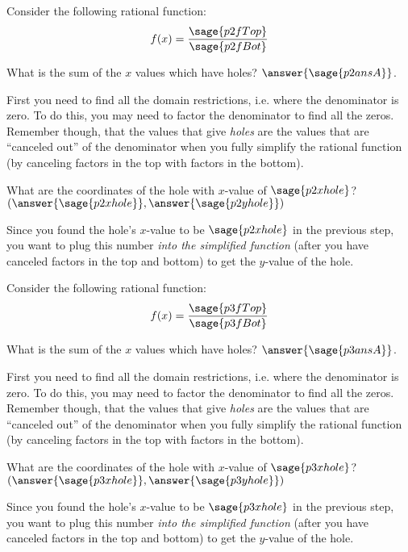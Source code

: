 \documentclass{ximera}
\begin{document}
\begin{problem}
    Consider the following rational function:
    \[
        f(x) = \frac{\sage{p2fTop}}{\sage{p2fBot}}
    \]
    
    What is the sum of the $x$ values which have holes? $\answer{\sage{p2ansA}}$.
    \begin{feedback}
        First you need to find all the domain restrictions, i.e. where the denominator is zero. To do this, you may need to factor the denominator to find all the zeros. Remember though, that the values that give \textit{holes} are the values that are ``canceled out'' of the denominator when you fully simplify the rational function (by canceling factors in the top with factors in the bottom).
    \end{feedback}
    \begin{problem}
        What are the coordinates of the hole with $x$-value of $\sage{p2xhole}$? $(\answer{\sage{p2xhole}},\answer{\sage{p2yhole}})$
        \begin{feedback}
            Since you found the hole's $x$-value to be $\sage{p2xhole}$ in the previous step, you want to plug this number \textit{into the simplified function} (after you have canceled factors in the top and bottom) to get the $y$-value of the hole.
        \end{feedback}
    \end{problem}

\end{problem}


\begin{problem}
    Consider the following rational function:
    \[
        f(x) = \frac{\sage{p3fTop}}{\sage{p3fBot}}
    \]
    
    What is the sum of the $x$ values which have holes? $\answer{\sage{p3ansA}}$.
    \begin{feedback}
        First you need to find all the domain restrictions, i.e. where the denominator is zero. To do this, you may need to factor the denominator to find all the zeros. Remember though, that the values that give \textit{holes} are the values that are ``canceled out'' of the denominator when you fully simplify the rational function (by canceling factors in the top with factors in the bottom).
    \end{feedback}
    \begin{problem}
        What are the coordinates of the hole with $x$-value of $\sage{p3xhole}$? $(\answer{\sage{p3xhole}},\answer{\sage{p3yhole}})$
        \begin{feedback}
            Since you found the hole's $x$-value to be $\sage{p3xhole}$ in the previous step, you want to plug this number \textit{into the simplified function} (after you have canceled factors in the top and bottom) to get the $y$-value of the hole.
        \end{feedback}
    \end{problem}

\end{problem}
\end{document}
